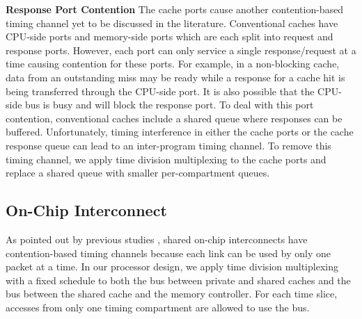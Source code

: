 \textbf{Response Port Contention}
The cache ports cause another contention-based timing channel yet to be 
discussed in the literature. Conventional caches have CPU-side ports and 
memory-side ports which are each split into request and response ports. 
However, each port can only service a single response/request at a time
causing contention for these ports. For example, in a non-blocking cache,
data from an outstanding miss may be ready while a response for a cache hit
is being transferred through the CPU-side port.
It is also possible that the CPU-side bus is busy and will block the response
port. 
To deal with this port contention, conventional caches include a shared queue
where responses can be buffered. Unfortunately, timing interference in either 
the cache ports or the cache response queue can
lead to an inter-program timing channel. To remove this timing channel, we apply
time division multiplexing to the cache ports and replace a shared queue with
smaller per-compartment queues.

\subsection{On-Chip Interconnect}

As pointed out by previous studies \cite{yaonocs, surfnoc}, shared on-chip 
interconnects have contention-based timing channels because each link can
be used by only one packet at a time. In our processor design, we apply time
division multiplexing with a fixed schedule to both the bus between private
and shared caches and the bus between the shared cache and the memory 
controller.
For each time slice, accesses from only one timing compartment are allowed to
use the bus.

